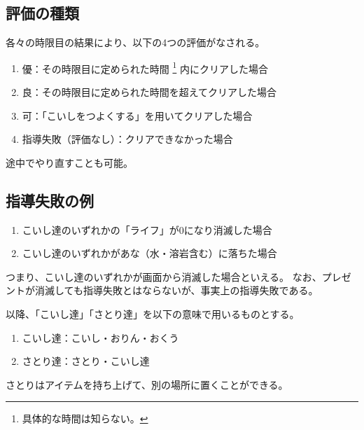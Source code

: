 \subsection{評価の種類}
各々の時限目の結果により、以下の4つの評価がなされる。
\begin{enumerate}[label={\sarrow}]
\item 優：その時限目に定められた時間%
\footnote{具体的な時間は知らない。}%
内にクリアした場合
\item 良：その時限目に定められた時間を超えてクリアした場合
\item 可：「こいしをつよくする」を用いてクリアした場合
\item 指導失敗（評価なし）：クリアできなかった場合
\end{enumerate}
途中でやり直すことも可能。


\subsection{指導失敗の例}
\begin{enumerate}[label={\sarrow}]
\item こいし達のいずれかの「ライフ」が0になり消滅した場合
\item こいし達のいずれかがあな（水・溶岩含む）に落ちた場合
\end{enumerate}
つまり、こいし達のいずれかが画面から消滅した場合といえる。
なお、プレゼントが消滅しても指導失敗とはならないが、事実上の指導失敗である。
\begin{marker}
以降、「こいし達」「さとり達」を以下の意味で用いるものとする。
\begin{enumerate}[label={\sarrow}]
\item こいし達：こいし・おりん・おくう
\item さとり達：さとり・こいし達
\end{enumerate}
\end{marker}


\clearpage
さとりはアイテムを持ち上げて、別の場所に置くことができる。

